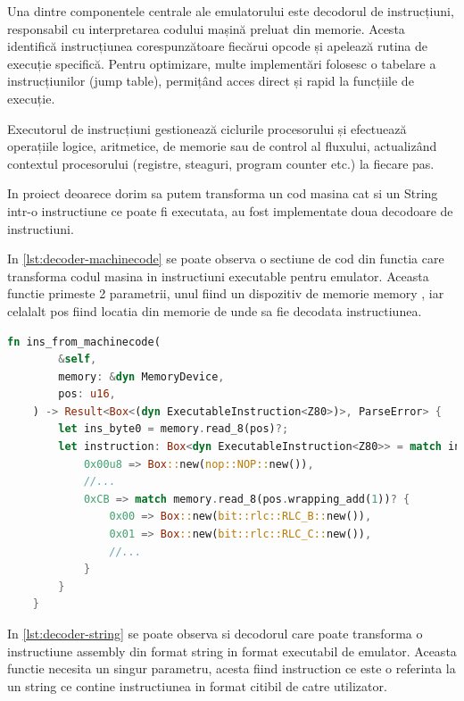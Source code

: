 \documentclass[titlepage,12pt]{article}
\DeclareRobustCommand{\code}[1]{{\ttfamily\small #1}}
\begin{document}
Una dintre componentele centrale ale emulatorului este decodorul de instrucțiuni, responsabil cu interpretarea codului mașină preluat din memorie. Acesta identifică instrucțiunea corespunzătoare fiecărui opcode și apelează rutina de execuție specifică. Pentru optimizare, multe implementări folosesc o tabelare a instrucțiunilor (jump table), permițând acces direct și rapid la funcțiile de execuție.

Executorul de instrucțiuni gestionează ciclurile procesorului și efectuează operațiile logice, aritmetice, de memorie sau de control al fluxului, actualizând contextul procesorului (registre, steaguri, program counter etc.) la fiecare pas.

In proiect deoarece dorim sa putem transforma un cod masina cat si un String intr-o instructiune ce poate fi executata, au fost implementate doua decodoare de instructiuni. 

In \cref{lst:decoder-machinecode} se poate observa o sectiune de cod din functia care transforma codul masina in instructiuni executable pentru emulator. Aceasta functie primeste 2 parametrii, unul fiind un dispozitiv de memorie \code{memory} , iar celalalt \code{pos} fiind locatia din memorie de unde sa fie decodata instructiunea.

\begin{lstlisting}[language=Rust,caption={Sectiune decodor din cod masina},label={lst:decoder-machinecode}]
fn ins_from_machinecode(
        &self,
        memory: &dyn MemoryDevice,
        pos: u16,
    ) -> Result<Box<(dyn ExecutableInstruction<Z80>)>, ParseError> {
        let ins_byte0 = memory.read_8(pos)?;
        let instruction: Box<dyn ExecutableInstruction<Z80>> = match ins_byte0 {
            0x00u8 => Box::new(nop::NOP::new()),
            //...
            0xCB => match memory.read_8(pos.wrapping_add(1))? {
                0x00 => Box::new(bit::rlc::RLC_B::new()),
                0x01 => Box::new(bit::rlc::RLC_C::new()),
                //...
            }
        }
    }
\end{lstlisting}

In \cref{lst:decoder-string} se poate observa si decodorul care poate transforma o instructiune assembly din format \code{string} in format executabil de emulator. Aceasta functie necesita un singur parametru, acesta fiind \code{instruction} ce este o referinta la un \code{string} ce contine instructiunea in format citibil de catre utilizator.
\end{document}
